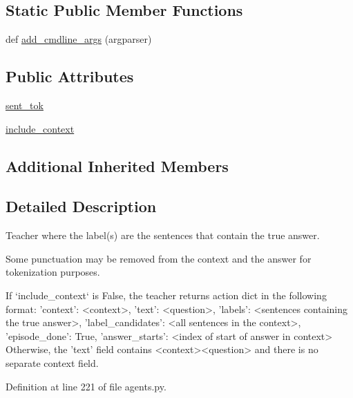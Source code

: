 \subsection*{Static Public Member Functions}
\begin{DoxyCompactItemize}
\item 
def \hyperlink{classparlai_1_1tasks_1_1squad_1_1agents_1_1SentenceTeacher_a7cbe635ae17b8deee040f3f23e9163fa}{add\+\_\+cmdline\+\_\+args} (argparser)
\end{DoxyCompactItemize}
\subsection*{Public Attributes}
\begin{DoxyCompactItemize}
\item 
\hyperlink{classparlai_1_1tasks_1_1squad_1_1agents_1_1SentenceTeacher_a35acf467970e62528b74dd9a3dcc45a9}{sent\+\_\+tok}
\item 
\hyperlink{classparlai_1_1tasks_1_1squad_1_1agents_1_1SentenceTeacher_a499aa8bdcd4d4af34d87a79fe7186854}{include\+\_\+context}
\end{DoxyCompactItemize}
\subsection*{Additional Inherited Members}


\subsection{Detailed Description}
\begin{DoxyVerb}Teacher where the label(s) are the sentences that contain the true answer.

Some punctuation may be removed from the context and the answer for
tokenization purposes.

If `include_context` is False, the teacher returns action dict in the
following format:
{
    'context': <context>,
    'text': <question>,
    'labels': <sentences containing the true answer>,
    'label_candidates': <all sentences in the context>,
    'episode_done': True,
    'answer_starts': <index of start of answer in context>
}
Otherwise, the 'text' field contains <context>\n<question> and there is
no separate context field.
\end{DoxyVerb}
 

Definition at line 221 of file agents.\+py.



